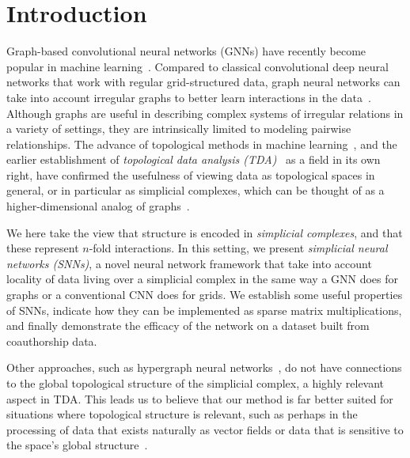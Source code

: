 \section{Introduction}

Graph-based convolutional neural networks (GNNs) have recently become popular in machine learning~\cite{defferrard2016convolutional, bronstein2017geometric, wu2020survey}. Compared to classical convolutional deep neural networks that work with regular grid-structured data, graph neural networks can take into account irregular graphs to better learn interactions in the data~\cite{battaglia2018relational}. Although graphs are useful in describing complex systems of irregular relations in a variety of settings, they are intrinsically limited to modeling pairwise relationships. The advance of topological methods in machine learning~\cite{Gabrielsson2020topological, Hofer2019LearningRO, rieck2018neural}, and the earlier establishment of \emph{topological data analysis (TDA)}~\cite{carlsson2008,chazal2017,edelsbrunner2010computational,ghrist2008barcodes} as a field in its own right, have confirmed the usefulness of viewing data as topological spaces in general, or in particular as simplicial complexes, which can be thought of as a higher-dimensional analog of graphs~\cite{moore2012,patania2017}.

We here take the view that structure is encoded in \emph{simplicial complexes}, and that these represent $n$-fold interactions. In this setting, we present \emph{simplicial neural networks (SNNs)}, a novel neural network framework that take into account locality of data living over a simplicial complex in the same way a GNN does for graphs or a conventional CNN does for grids. We establish some useful properties of SNNs, indicate how they can be implemented as sparse matrix multiplications, and finally demonstrate the efficacy of the network on a dataset built from coauthorship data.

Other approaches, such as hypergraph neural networks~\cite{feng2018hypergraphs}, do not have connections to the global topological structure of the simplicial complex, a highly relevant aspect in TDA. This leads us to believe that our method is far better suited for situations where topological structure is relevant, such as perhaps in the processing of data that exists naturally as vector fields or data that is sensitive to the space's global structure~\cite{perraudin2019deepsphere}.

